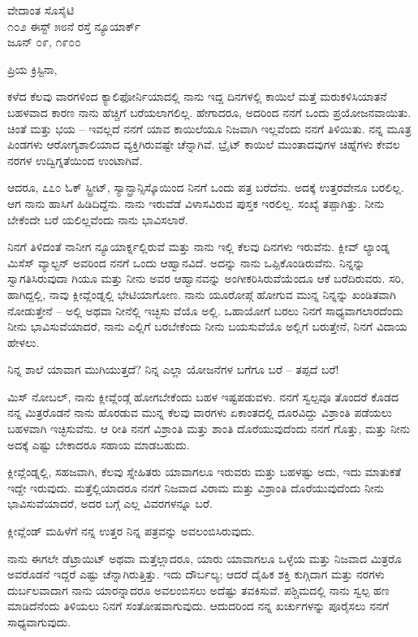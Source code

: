 \begin{flushright}
ವೇದಾಂತ ಸೊಸೈಟಿ\\೧೦೨ ಈಸ್ಟ್ ೫೮ನೆ ರಸ್ತೆ ನ್ಯೂಯಾರ್ಕ್\\ಜೂನ್ ೦೯, ೧೯೦೦
\end{flushright}

ಪ್ರಿಯ ಕ್ರಿಸ್ಟಿನಾ,

ಕಳೆದ ಕೆಲವು ವಾರಗಳಿಂದ ಕ್ಯಾಲಿಫೋರ್ನಿಯಾದಲ್ಲಿ ನಾನು ಇದ್ದ ದಿನಗಳಲ್ಲಿ ಕಾಯಿಲೆ ಮತ್ತೆ ಮರುಕಳಿಸಿಯಾತನೆ ಬಹಳವಾದ ಕಾರಣ ನಾನು ಹೆಚ್ಚಿಗೆ ಬರೆಯಲಾಗಲಿಲ್ಲ. ಹೇಗಾದರೂ, ಅದರಿಂದ ನನಗೆ ಒಂದು ಪ್ರಯೋಜನವಾಯಿತು. ಚಿಂತೆ ಮತ್ತು ಭಯ – ಇವಲ್ಲದೆ ನನಗೆ ಯಾವ ಕಾಯಿಲೆಯೂ ನಿಜವಾಗಿ ಇಲ್ಲವೆಂದು ನನಗೆ ತಿಳಿಯಿತು. ನನ್ನ ಮೂತ್ರ ಪಿಂಡಗಳು ಆರೋಗ್ಯಶಾಲಿಯಾದ ವ್ಯಕ್ತಿಗಿರುವಷ್ಟೇ ಚೆನ್ನಾಗಿವೆ. ಬ್ರೈಟ್ ಕಾಯಿಲೆ ಮುಂತಾದವುಗಳ ಚಿಹ್ನೆಗಳು ಕೇವಲ ನರಗಳ ಉದ್ವಿಗ್ನತೆಯಿಂದ ಉಂಟಾಗಿವೆ.

ಆದರೂ, ೭೭೦ ಓಕ್ ಸ್ಟ್ರೀಟ್, ಸ್ಯಾನ್ಫ್ರಾನ್ಸಿಸ್ಕೊಯಿಂದ ನಿನಗೆ ಒಂದು ಪತ್ರ ಬರೆದೆನು. ಅದಕ್ಕೆ ಉತ್ತರವೇನೂ ಬರಲಿಲ್ಲ. ಆಗ ನಾನು ಹಾಸಿಗೆ ಹಿಡಿದಿದ್ದೆನು. ನಾನು ಇರುವೆಡೆ ವಿಳಾಸವಿರುವ ಪುಸ್ತಕ ಇರಲಿಲ್ಲ. ಸಂಖ್ಯೆ ತಪ್ಪಾಗಿತ್ತು. ನೀನು ಬೇಕೆಂದೇ ಬರೆ ಯಲಿಲ್ಲವೆಂದು ನಾನು ಭಾವಿಸಲಾರೆ.

ನಿನಗೆ ತಿಳಿದಂತೆ ನಾನೀಗ ನ್ಯೂಯಾರ್ಕ್ನಲ್ಲಿರುವೆ ಮತ್ತು ನಾನು ಇಲ್ಲಿ ಕೆಲವು ದಿನಗಳು ಇರುವೆನು. ಕ್ಲೀವ್ ಲ್ಯಾಂಡ್ನ ಮಿಸೆಸ್ ವ್ಯಾಲ್ಟನ್ ಅವರಿಂದ ನನಗೆ ಒಂದು ಆಹ್ವಾನವಿದೆ. ಅದನ್ನು ನಾನು ಒಪ್ಪಿಕೊಂಡಿರುವೆನು. ನಿನ್ನನ್ನು ಸ್ವಾಗತಿಸಿರುವುದಾ ಗಿಯೂ ಮತ್ತು ನೀನು ಅವರ ಆಹ್ವಾನವನ್ನು ಅಂಗೀಕರಿಸಿರುವೆಯೆಂದೂ ಆಕೆ ಬರೆದಿರುವರು. ಸರಿ, ಹಾಗಿದ್ದಲ್ಲಿ, ನಾವು ಕ್ಲೀವ್ಲೆಂಡ್ನಲ್ಲಿ ಭೇಟಿಯಾಗೋಣ. ನಾನು ಯೂರೋಪ್ಗೆ ಹೋಗುವ ಮುನ್ನ ನಿನ್ನನ್ನು ಖಂಡಿತವಾಗಿ ನೋಡುತ್ತೇನೆ – ಅಲ್ಲಿ ಅಥವಾ ನೀನೆಲ್ಲಿ ಇಚ್ಛಿಸು ವೆಯೊ ಅಲ್ಲಿ. ಒಹಾಯೋಗೆ ಬರಲು ನಿನಗೆ ಸಾಧ್ಯವಾಗಲಾರದೆಂದು ನೀನು ಭಾವಿಸುವೆಯಾದರೆ, ನಾನು ಎಲ್ಲಿಗೆ ಬರಬೇಕೆಂದು ನೀನು ಬಯಸುವೆಯೊ ಅಲ್ಲಿಗೆ ಬರುತ್ತೇನೆ, ನಿನಗೆ ವಿದಾಯ ಹೇಳಲು.

ನಿನ್ನ ಶಾಲೆ ಯಾವಾಗ ಮುಗಿಯುತ್ತದೆ? ನಿನ್ನ ಎಲ್ಲಾ ಯೋಜನೆಗಳ ಬಗೆಗೂ ಬರೆ – ತಪ್ಪದೆ ಬರೆ!

ಮಿಸ್ ನೋಬಲ್, ನಾನು ಕ್ಲೀವ್ಲೆಂಡ್ಗೆ ಹೋಗಬೇಕೆಂದು ಬಹಳ ಇಷ್ಟಪಡುವಳು. ನನಗೆ ಸ್ವಲ್ಪವೂ ತೊಂದರೆ ಕೊಡದ ನನ್ನ ಮಿತ್ರರೊಡನೆ ನಾನು ಹೊರಡುವ ಮುನ್ನ ಕೆಲವು ವಾರಗಳು ಏಕಾಂತದಲ್ಲಿ ದೂರವಿದ್ದು ವಿಶ್ರಾಂತಿ ಪಡೆಯಲು ಬಹಳವಾಗಿ ಇಚ್ಛಿಸುವೆನು. ಆ ರೀತಿ ನನಗೆ ವಿಶ್ರಾಂತಿ ಮತ್ತು ಶಾಂತಿ ದೊರೆಯುವುದೆಂದು ನನಗೆ ಗೊತ್ತು, ಮತ್ತು ನೀನು ಅದಕ್ಕೆ ಎಷ್ಟು ಬೇಕಾದರೂ ಸಹಾಯ ಮಾಡಬಹುದು.

ಕ್ಲೀವ್ಲೆಂಡ್ನಲ್ಲಿ, ಸಹಜವಾಗಿ, ಕೆಲವು ಸ್ನೇಹಿತರು ಯಾವಾಗಲೂ ಇರುವರು ಮತ್ತು ಬಹಳಷ್ಟು ಅದು, ಇದು ಮಾತುಕತೆ ಇದ್ದೇ ಇರುವುದು. ಮತ್ತೆಲ್ಲಿಯಾದರೂ ನನಗೆ ನಿಜವಾದ ವಿರಾಮ ಮತ್ತು ವಿಶ್ರಾಂತಿ ದೊರೆಯುವುದೆಂದು ನೀನು ಭಾವಿಸುವೆಯಾದರೆ, ಅದರ ಬಗ್ಗೆ ಎಲ್ಲ ವಿವರಗಳನ್ನೂ ಬರೆ.

ಕ್ಲೀವ್ಲೆಂಡ್ ಮಹಿಳೆಗೆ ನನ್ನ ಉತ್ತರ ನಿನ್ನ ಪತ್ರವನ್ನು ಅವಲಂಬಿಸಿರುವುದು.

ನಾನು ಈಗಲೇ ಡೆಟ್ರಾಯಿಟ್ ಅಥವಾ ಮತ್ತೆಲ್ಲಾದರೂ, ಯಾರು ಯಾವಾಗಲೂ ಒಳ್ಳೆಯ ಮತ್ತು ನಿಜವಾದ ಮಿತ್ರರೊ ಅವರೊಡನೆ ಇದ್ದರೆ ಎಷ್ಟು ಚೆನ್ನಾಗಿರುತ್ತಿತ್ತು. ಇದು ದೌರ್ಬಲ್ಯ; ಆದರೆ ದೈಹಿಕ ಶಕ್ತಿ ಕುಗ್ಗಿದಾಗ ಮತ್ತು ನರಗಳು ದುರ್ಬಲವಾದಾಗ ನಾನು ಯಾರನ್ನಾದರೂ ಅವಲಂಬಿಸಲು ಅದೆಷ್ಟು ತವಕಿಸುವೆ. ಪಶ್ಚಿಮದಲ್ಲಿ ನಾನು ಸ್ವಲ್ಪ ಹಣ ಮಾಡಿದೆನೆಂದು ತಿಳಿಯಲು ನಿನಗೆ ಸಂತೋಷವಾಗುವುದು. ಆದುದರಿಂದ ನನ್ನ ಖರ್ಚುಗಳನ್ನು ಪೂರೈಸಲು ನನಗೆ ಸಾಧ್ಯವಾಗುವುದು.

